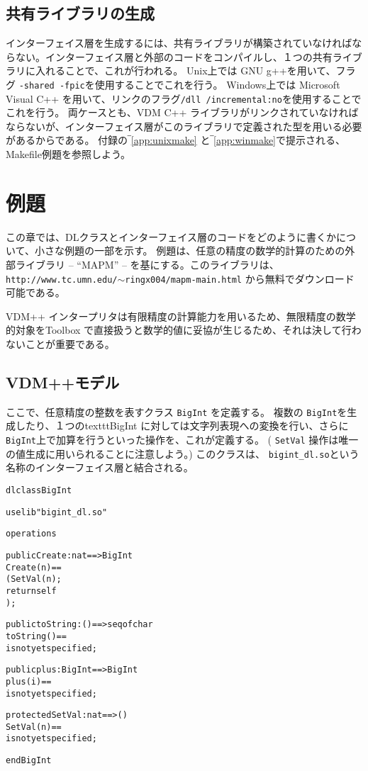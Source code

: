 \documentclass[\pformat,12pt]{jarticle}
\begin{document}
\subsection{共有ライブラリの生成}

インターフェイス層を生成するには、共有ライブラリが構築されていなければならない。インターフェイス層と外部のコードをコンパイルし、１つの共有ライブラリに入れることで、これが行われる。
Unix上では GNU g++を用いて、フラグ \texttt{-shared -fpic}を使用することでこれを行う。
Windows上では Microsoft Visual C++ を用いて、リンクのフラグ\texttt{/dll /incremental:no}を使用することでこれを行う。
両ケースとも、VDM C++ ライブラリがリンクされていなければならないが、インターフェイス層がこのライブラリで定義された型を用いる必要があるからである。
付録の‾\ref{app:unixmake} と‾\ref{app:winmake}で提示される、Makefile例題を参照しよう。 

\section{例題}\label{sec:dlexample}

この章では、DLクラスとインターフェイス層のコードをどのように書くかについて、小さな例題の一部を示す。
例題は、任意の精度の数学的計算のための外部ライブラリ -- ``MAPM'' -- を基にする。このライブラリは、
\texttt{http://www.tc.umn.edu/$\sim$ringx004/mapm-main.html}
から無料でダウンロード可能である。

 VDM++ インタープリタは有限精度の計算能力を用いるため、無限精度の数学的対象をToolbox で直接扱うと数学的値に妥協が生じるため、それは決して行わないことが重要である。 

\subsection{VDM++モデル}

ここで、任意精度の整数を表すクラス \texttt{BigInt} を定義する。 
複数の \texttt{BigInt}を生成したり、１つのtexttt{BigInt} に対しては文字列表現への変換を行い、さらに \texttt{BigInt}上で加算を行うといった操作を、これが定義する。 
( \texttt{SetVal} 操作は唯一の値生成に用いられることに注意しよう。) 
このクラスは、 \texttt{bigint\_dl.so}という名称のインターフェイス層と結合される。 

\begin{alltt}
\textsf{dlclass} BigInt

\textsf{uselib} "bigint_dl.so"

\textsf{operations}

\textsf{public} Create : \textsf{nat} ==> BigInt
Create(n) ==
( SetVal(n);
  \textsf{return} self
);

\textsf{public} toString : () ==> \textsf{seq} \textsf{of} \textsf{char}
toString() ==
  \textsf{is} \textsf{not} \textsf{yet} \textsf{specified};

\textsf{public} plus : BigInt ==> BigInt
plus(i) ==
  \textsf{is} \textsf{not} \textsf{yet} \textsf{specified};

\textsf{protected} SetVal : \textsf{nat} ==> ()
SetVal(n) ==
  \textsf{is} \textsf{not} \textsf{yet} \textsf{specified};

\textsf{end} BigInt
\end{alltt}
\end{document}
